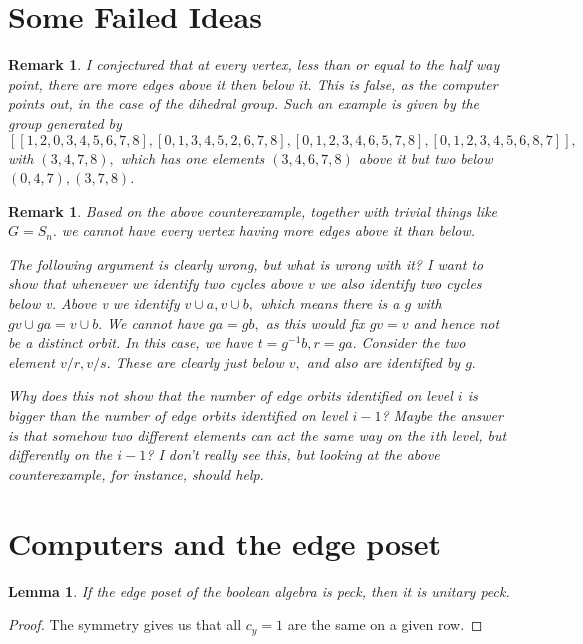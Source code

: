 \documentclass{amsart}
\newtheorem{lem}[subsubsection]{Lemma}
\newtheorem{rem}[subsubsection]{Remark}
\begin{document}
\section{Some Failed Ideas}

\begin{rem}
I conjectured that at every vertex, less than or equal to the half way point, there are more edges above it then below it. This is false, as the computer points out, in the case of the dihedral group. Such an example is given by the group generated by $[[1,2,0,3,4,5,6,7,8],[0,1,3,4,5,2,6,7,8],[0,1,2,3,4,6,5,7,8],[0,1,2,3,4,5,6,8,7]],$ with $(3,4,7,8),$ which has one elements $(3,4,6,7,8)$ above it but two below $(0,4,7),(3,7,8)$.

\end{rem}
\begin{rem}
Based on the above counterexample, together with trivial things like $G = S_n.$ we cannot have every vertex having more edges above it than below.

The following argument is clearly wrong, but what is wrong with it? I want to show that whenever we identify two cycles above $v$ we also identify two cycles below v. Above v we identify $v \cup a,v \cup b,$ which means there is a $g$ with $gv\cup ga = v \cup b.$ We cannot have $ga = gb,$ as this would fix $gv=v$ and hence not be a distinct orbit. In this case, we have $t = g^{-1}b,r = ga.$ Consider the two element $v/r,v/s.$ These are clearly just below $v,$ and also are identified by $g.$ 

Why does this not show that the number of edge orbits identified on level $i$ is bigger than the number of edge orbits identified on level $i-1$? Maybe the answer is that somehow two different elements can act the same way on the $i$th level, but differently on the $i-1$? I don't really see this, but looking at the above counterexample, for instance, should help.
\end{rem}

\section{Computers and the edge poset}


\begin{lem}
If the edge poset of the boolean algebra is peck, then it is unitary peck. 
\end{lem}
\begin{proof}
The symmetry gives us that all $c_y=1$ are the same on a given row.
\end{proof}
\end{document}
